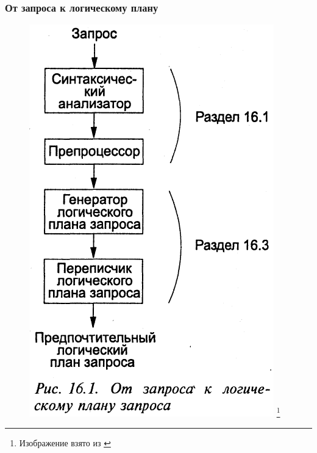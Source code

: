 \documentclass{beamer}
\begin{document}
\begin{frame}
\frametitle{От запроса к логическому плану}

\begin{figure}[htb]
\includegraphics[width=\textwidth,height=0.8\textheight,keepaspectratio]{query-to-logical.png} 
\footnote{\tiny{Изображение взято из \cite{Ulman2004}}}
\end{figure}

\end{frame}
\end{document}
